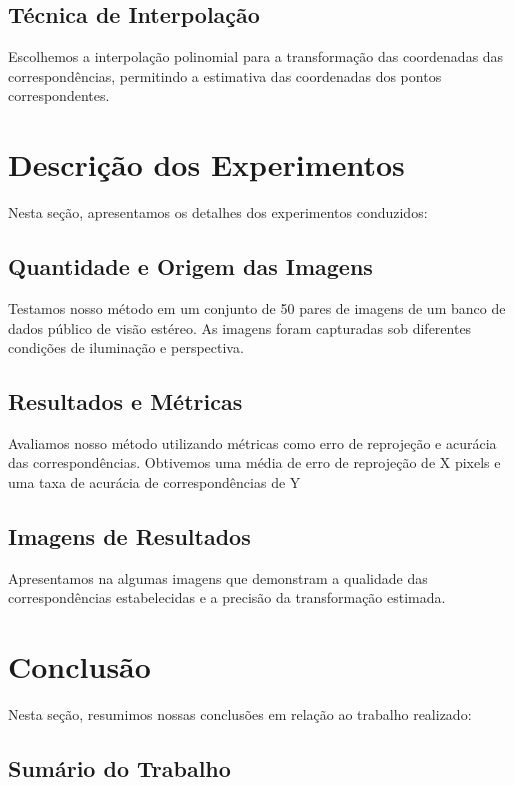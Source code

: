 \documentclass{article}
\begin{document}
\subsection{Técnica de Interpolação}

Escolhemos a interpolação polinomial para a transformação das coordenadas das correspondências, permitindo a estimativa das coordenadas dos pontos correspondentes.

\section{Descrição dos Experimentos}

Nesta seção, apresentamos os detalhes dos experimentos conduzidos:

\subsection{Quantidade e Origem das Imagens}

Testamos nosso método em um conjunto de 50 pares de imagens de um banco de dados público de visão estéreo. As imagens foram capturadas sob diferentes condições de iluminação e perspectiva.

\subsection{Resultados e Métricas}

Avaliamos nosso método utilizando métricas como erro de reprojeção e acurácia das correspondências. Obtivemos uma média de erro de reprojeção de X pixels e uma taxa de acurácia de correspondências de Y%

\subsection{Imagens de Resultados}

Apresentamos na algumas imagens que demonstram a qualidade das correspondências estabelecidas e a precisão da transformação estimada.

\section{Conclusão}

Nesta seção, resumimos nossas conclusões em relação ao trabalho realizado:

\subsection{Sumário do Trabalho}
\end{document}
